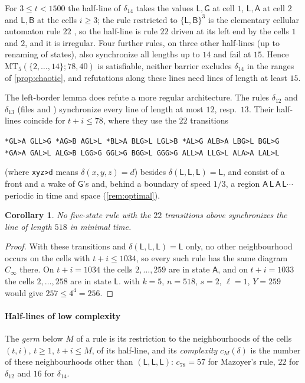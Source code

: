 \documentclass[3p]{elsarticle}
\newtheorem{corollary}[theorem]{Corollary}
\theoremstyle{remark}
\begin{document}
For $3\le t<1500$ the half-line of $\delta_{14}$ takes the values
$\mathsf L,\mathsf G$ at cell $1$, $\mathsf L,\mathsf A$ at cell $2$ and
$\mathsf L,\mathsf B$ at the cells $i\ge3$; the rule restricted to $\{\mathsf
L,\mathsf B\}^3$ is the elementary cellular automaton rule $22$
\cite{Wolfram83}, so the half-line is rule $22$ driven at its left end by the
cells $1$ and $2$, and it is irregular. Four further rules, on three other
half-lines (up to renaming of states), also synchronize all lengths up to $14$
and fail at $15$. Hence
$\mathrm{MT}_5(\{2,\dots,14\};78,40)$ is satisfiable, neither barrier excludes
$\delta_{14}$ in the ranges of \cref{prop:chaotic}, and refutations along
these lines need lines of length at least $15$.

The left-border lemma does refute a more regular architecture. The rules
$\delta_{12}$ and $\delta_{13}$ (files  and
) synchronize every line of length at most $12$,
resp.\ $13$. Their half-lines coincide for $t+i\le78$, where they use the $22$
transitions
\begin{center}\small
\texttt{*GL>A GLL>G *AG>B AGL>L *BL>A BLG>L LGL>B *AL>G ALB>A LBG>L BGL>G}\\
\texttt{*GA>A GAL>L ALG>B LGG>G GGL>G BGG>L GGG>G ALL>A LLG>L ALA>A LAL>L}
\end{center}
(where \texttt{xyz>d} means $\delta(x,y,z)=d$) besides
$\delta(\mathsf L,\mathsf L,\mathsf L)=\mathsf L$, and consist of a front and a
wake of $\mathsf G$'s and, behind a boundary of speed $1/3$, a region
$\mathsf A\,\mathsf L\,\mathsf A\,\mathsf L\cdots$ periodic in time and space
(\cref{rem:optimal}).

\begin{corollary}\label{cor:germ12}
No five-state rule with the $22$ transitions above synchronizes the line of
length $518$ in minimal time.
\end{corollary}

\begin{proof}
With these transitions and $\delta(\mathsf L,\mathsf L,\mathsf L)=\mathsf L$
only, no other neighbourhood occurs on the cells with $t+i\le1034$, so every
such rule has the same diagram $C_\infty$ there. On $t+i=1034$ the cells
$2,\dots,259$ are in state $\mathsf A$, and on $t+i=1033$ the cells
$2,\dots,258$ are in state $\mathsf L$.  with $k=5$, $n=518$,
$s=2$, $\ell=1$, $Y=259$ would give $257\le4^4=256$.
\end{proof}

\paragraph{Half-lines of low complexity} The \emph{germ} below $M$ of a rule is
its restriction to the neighbourhoods of the cells $(t,i)$, $t\ge1$, $t+i\le M$,
of its half-line, and its \emph{complexity} $c_M(\delta)$ is the number of these
neighbourhoods other than $(\mathsf L,\mathsf L,\mathsf L)$: $c_{78}=57$ for
Mazoyer's rule, $22$ for $\delta_{12}$ and $16$ for $\delta_{14}$.
\end{document}
